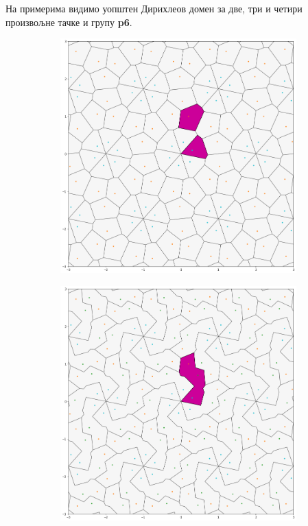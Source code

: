 \documentclass[12pt]{article}
\begin{document}


\begin{samepage}
На примерима видимо уопштен Дирихлеов домен за две, три и четири произвољне тачке и групу \textbf{p6}.

\begin{figure}[H]
  \begin{subfigure}[b]{0.32\textwidth}
    \includegraphics[width=.9\textwidth]{visetacaka1.png}
    \label{fig:f4}
  \end{subfigure}
  \begin{subfigure}[b]{0.32\textwidth}
    \includegraphics[width=.9\textwidth]{visetacaka2.png}

\end{subfigure}
\end{figure}
\end{samepage}
\end{document}

